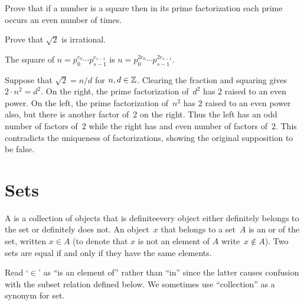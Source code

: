 \documentclass{ibl}  %
\begin{document}
\begin{ex} 
\begin{exes}
\item Prove that if a number is a square then in its prime factorization 
  each prime occurs an even number of times.
\item Prove that $\sqrt{2}$ is irrational.
\end{exes}
\begin{ans}
\begin{exes}
\item The square of $n=p_0^{e_0}\cdots p_{s-1}^{e_{s-1}}$ is
  $n=p_0^{2e_0}\cdots p_{s-1}^{2e_{s-1}}$.
\item Suppose that $\sqrt{2}=n/d$ for $n,d\in\mathbb{Z}$.
  Clearing the fraction and squaring gives $2\cdot n^2=d^2$.
  On the right, the prime factorization of~$d^2$ has $2$ raised to an even 
  power.
  On the left, the prime factorization of~$n^2$ has $2$ raised to an even power
  also, but there is another factor of~$2$ on the right.
  Thus the left has an odd number of factors of~$2$ while the right has
  and even number of factors of~$2$.
  This contradicts the uniqueness of factorizations, showing the 
  original supposition to be false. 
\end{exes}
\end{ans}
\end{ex}










\chapter{Sets}
\begin{df}
A  is a collection of objects that is definite\Dash every 
object either
definitely belongs to the set or definitely does not.
An object~$x$ that belongs to a set~$A$ is an 
or 
of the set, written $x\in A$
(to denote that $x$ is not an element of $A$ write~$x\notin A$).
Two sets are equal if and only if they have the same elements.
\end{df}
\noindent Read `$\in$' as ``is an element of'' rather than ``in'' since the 
latter causes confusion with 
the subset relation defined below.
We sometimes use ``collection'' as a synonym for set.
\end{document}
